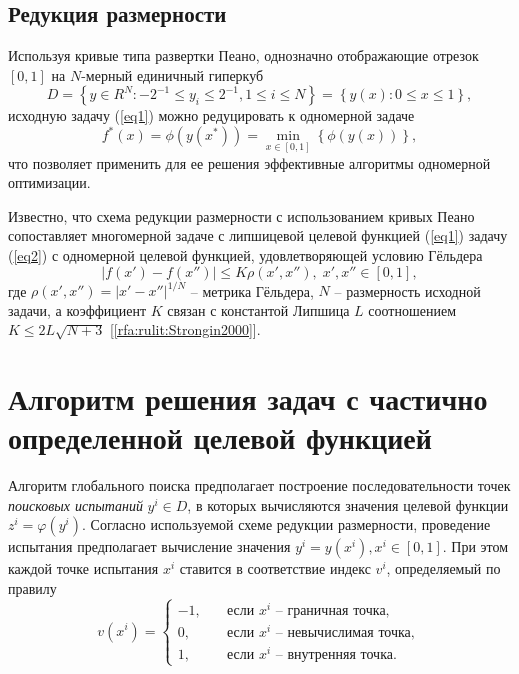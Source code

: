 \documentclass[a4paper,12pt,russian]{article}
\begin{document}
\subsection{Редукция размерности}

Используя кривые типа развертки Пеано, однозначно отображающие отрезок $[0,1]$ на $N$-мерный единичный гиперкуб
\begin{equation}\label{eq2_} 
D=\left\{ y \in R^N: -2^{-1} \leq y_i \leq 2^{-1}, 1 \leq i \leq N \right\} = \left\{ y(x): 0 \leq x \leq 1 \right\},
\end{equation}
исходную задачу (\ref{eq1}) можно редуцировать к одномерной задаче
\begin{equation}\label{eq2} 
f^*(x)=\phi(y(x^* ))=\min_{x \in [0,1]} \left\{ \phi(y(x)) \right\},
\end{equation}
что позволяет применить для ее решения эффективные алгоритмы одномерной оптимизации. %


Известно, что схема редукции размерности с использованием кривых Пеано сопоставляет многомерной задаче с липшицевой целевой функцией (\ref{eq1}) задачу (\ref{eq2}) с одномерной целевой функцией, удовлетворяющей условию Гёльдера
\begin{equation}\label{eq4} 
| f(x')-f(x'') | \leq K \rho(x',x''), \; x',x'' \in [0,1],
\end{equation}
где $\rho(x',x'') =  |x' - x''|^{1/N}$ -- метрика Гёльдера, $N$ -- размерность исходной задачи, а коэффициент $K$ связан с константой Липшица $L$ соотношением $K \leq 2L\sqrt {N+3}$ [\ref{rfa:rulit:Strongin2000}].

\section{Алгоритм решения задач с частично определенной целевой функцией}\label{alg_discr}

Алгоритм глобального поиска предполагает построение последовательности точек \textit{поисковых испытаний} $y^i \in D$, в которых вычисляются значения целевой функции $z^i = \varphi(y^i)$. Согласно используемой схеме редукции размерности, проведение испытания предполагает вычисление значения $y^i=y(x^i), x^i \in [0,1]$. При этом каждой точке испытания $x^i$ ставится в соответствие индекс $v^i$, определяемый по правилу
\begin{equation}\label{eq6} 
v(x^i) =
  \begin{cases}
    -1, & {\quad \text{если } x^i \text{ -- граничная точка}},\\
    0, & {\quad \text{если } x^i \text{ -- невычислимая точка}},\\
    1, & {\quad \text{если } x^i \text{ -- внутренняя точка}}.
  \end{cases}
\end{equation}
\end{document}
